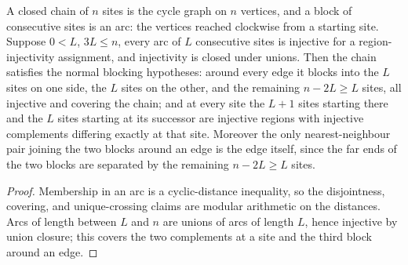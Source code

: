 \begin{theorem}%
    \label{thm:peps_cycleNormalPEPSBlockingHypotheses}
    \leanok
    A closed chain of $n$ sites is the cycle graph on $n$ vertices, and a
    block of consecutive sites is an arc: the vertices reached clockwise
    from a starting site.  Suppose $0 < L$, $3L \le n$, every arc
    of $L$ consecutive sites is injective for a region-injectivity
    assignment, and injectivity is closed under unions.  Then the chain
    satisfies the normal blocking hypotheses: around every edge it blocks
    into the $L$ sites on one side, the $L$ sites on the other, and the
    remaining $n - 2L \ge L$ sites, all injective and covering the chain;
    and at every site the $L + 1$ sites starting there and the $L$ sites
    starting at its successor are injective regions with injective
    complements differing exactly at that site.  Moreover the only
    nearest-neighbour pair joining the two blocks around an edge is the edge
    itself, since the far ends of the two blocks are separated by the
    remaining $n - 2L \ge L$ sites.
\end{theorem}
\begin{proof}\leanok
    Membership in an arc is a cyclic-distance inequality, so the
    disjointness, covering, and unique-crossing claims are modular
    arithmetic on the distances.  Arcs of length between $L$ and $n$ are
    unions of arcs of length $L$, hence injective by union closure; this
    covers the two complements at a site and the third block around an
    edge.
\end{proof}

